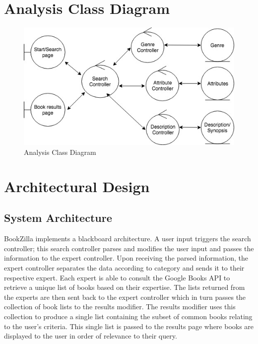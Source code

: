\documentclass[12pt]{article}
\begin{document}
\section{Analysis Class Diagram}
\label{sec:analysis_class_diagram}
\begin{figure}[h]
\centering
\includegraphics[scale=0.7]{AnalysisClassDiagram.jpeg}
\caption{Analysis Class Diagram}
\label{fig: analysis class diagram}
\end{figure}


\section{Architectural Design}
\label{sec:architectural_design}


\subsection{System Architecture}
\label{sub:system_architecture}
BookZilla implements a blackboard architecture. A user input triggers the search controller; this search controller parses and modifies the user input and passes the information to the expert controller. Upon receiving the parsed information, the expert controller separates the data according to category and sends it to their respective expert. Each expert is able to consult the Google Books API to retrieve a unique list of books based on their expertise. The lists returned from the experts are then sent back to the expert controller which in turn passes the collection of book lists to the results modifier. The results modifier uses this collection to produce a single list containing the subset of common books relating to the user's criteria. This single list is passed to the results page where books are displayed to the user in order of relevance to their query.\\
\end{document}
